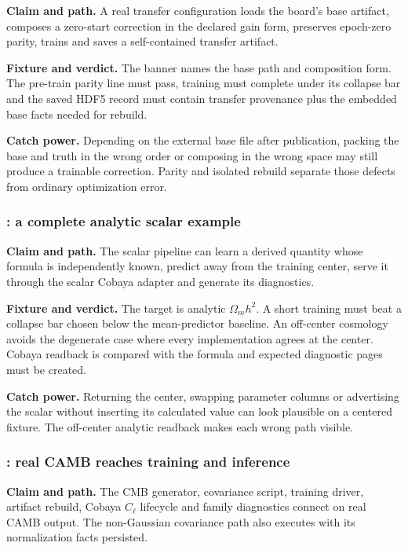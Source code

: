 \textbf{Claim and path.}  A real transfer configuration loads the board's base
artifact, composes a zero-start correction in the declared gain form,
preserves epoch-zero parity, trains and saves a self-contained transfer
artifact.

\textbf{Fixture and verdict.}  The banner names the base path and composition
form.  The pre-train parity line must pass, training must complete under its
collapse bar and the saved HDF5 record must contain transfer provenance plus
the embedded base facts needed for rebuild.

\textbf{Catch power.}  Depending on the external base file after publication,
packing the base and truth in the wrong order or composing in the wrong
space may still produce a trainable correction.  Parity and isolated rebuild
separate those defects from ordinary optimization error.

\subsubsection{: a complete analytic scalar example}

\textbf{Claim and path.}  The scalar pipeline can learn a derived quantity
whose formula is independently known, predict away from the training center,
serve it through the scalar Cobaya adapter and generate its diagnostics.

\textbf{Fixture and verdict.}  The target is analytic
\(\Omega_m h^2\).  A short training must beat a collapse bar chosen below the
mean-predictor baseline.  An off-center cosmology avoids the degenerate case
where every implementation agrees at the center.  Cobaya
 readback is compared with the formula and expected diagnostic
pages must be created.

\textbf{Catch power.}  Returning the center, swapping parameter columns or
advertising the scalar without inserting its calculated value can look
plausible on a centered fixture.  The off-center analytic readback makes each
wrong path visible.

\subsubsection{: real CAMB reaches training and inference}

\textbf{Claim and path.}  The CMB generator, covariance script, training
driver, artifact rebuild, Cobaya \(C_\ell\) lifecycle and family diagnostics
connect on real CAMB output.  The non-Gaussian covariance path also executes
with its normalization facts persisted.

